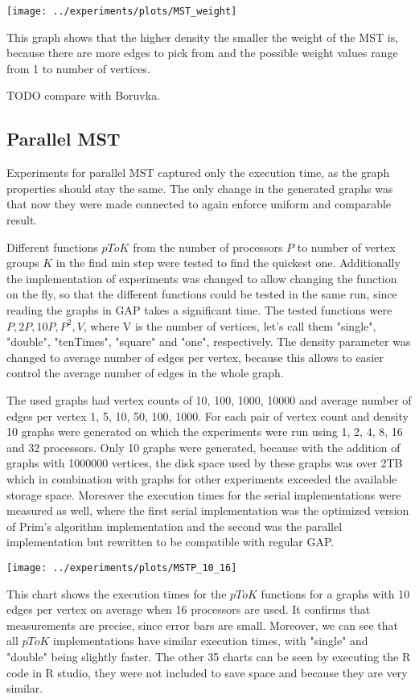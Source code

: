 \documentclass{report}
\theoremstyle{plain}
\theoremstyle{definition}
\theoremstyle{remark}
\begin{document}
\texttt{[image: ../experiments/plots/MST\_weight]}

This graph shows that the higher density the smaller the weight of the MST is, because there are more edges to pick from and the possible weight values range from 1 to number of vertices.

TODO compare with Boruvka.

\subsection{Parallel MST}

Experiments for parallel MST captured only the execution time, as the graph properties should stay the same. The only change in the generated graphs was that now they were made connected to again enforce uniform and comparable result.

Different functions $pToK$ from the number of processors $P$ to number of vertex groups $K$ in the find min step were tested to find the quickest one. Additionally the implementation of experiments was changed to allow changing the function on the fly, so that the different functions could be tested in the same run, since reading the graphs in GAP takes a significant time. The tested functions were $P, 2P, 10P, P^2, V$, where V is the number of vertices, let's call them "single", "double", "tenTimes", "square" and "one", respectively. The density parameter was changed to average number of edges per vertex, because this allows to easier control the average number of edges in the whole graph.

The used graphs had vertex counts of 10, 100, 1000, 10000 and average number of edges per vertex 1, 5, 10, 50, 100, 1000. For each pair of vertex count and density 10 graphs were generated on which the experiments were run using 1, 2, 4, 8, 16 and 32 processors. Only 10 graphs were generated, because with the addition of graphs with 1000000 vertices, the disk space used by these graphs was over 2TB which in combination with graphs for other experiments exceeded the available storage space.
Moreover the execution times for the serial implementations were measured as well, where the first serial implementation was the optimized version of Prim's algorithm implementation and the second was the parallel implementation but rewritten to be compatible with regular GAP.

\texttt{[image: ../experiments/plots/MSTP\_10\_16]}

This chart shows the execution times for the $pToK$ functions for a graphs with 10 edges per vertex on average when 16 processors are used. It confirms that measurements are precise, since error bars are small. Moreover, we can see that all $pToK$ implementations have similar execution times, with "single" and "double" being slightly faster. The other 35 charts can be seen by executing the R code in R studio, they were not included to save space and because they are very similar.
\end{document}
